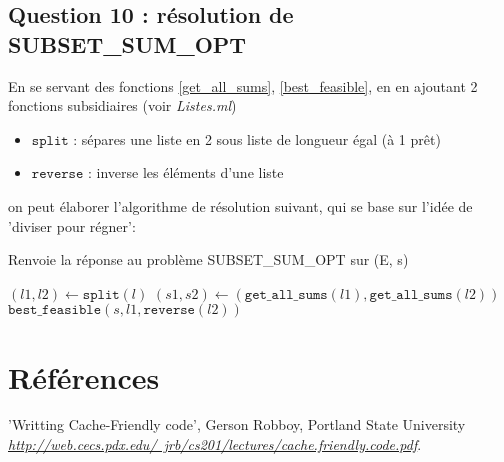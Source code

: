 \documentclass[10pt]{article}
\let\oldReturn\Return
\renewcommand{\Return}{\State\oldReturn}
\begin{document}
			\subsection{Question 10 : résolution de SUBSET\_SUM\_OPT}
				En se servant des fonctions \ref{get_all_sums}, \ref{best_feasible},
				en en ajoutant 2 fonctions subsidiaires (voir \textit{Listes.ml})
				\begin{itemize}[label=-]
					\setlength\itemsep{0.1em}
					\item $\mathtt{split}$ : sépares une liste en 2 sous liste de longueur égal (à 1 prêt)
					\item $\mathtt{reverse}$ : inverse les éléments d'une liste
				\end{itemize}
				on peut élaborer l'algorithme de résolution suivant, qui se base sur l'idée de 'diviser pour régner':
				\begin{algorithm}
					\caption{Renvoie la réponse au problème SUBSET\_SUM\_OPT sur (E, s)}
					\begin{algorithmic}[1]
							\State $(l1, l2) \leftarrow \mathtt{split}(l)$
							\State $(s1, s2) \leftarrow (\mathtt{get\_all\_sums}(l1), \mathtt{get\_all\_sums}(l2))$
							\Return $\mathtt{best\_feasible}(s, l1, \mathtt{reverse}(l2))$
						\EndFunction
					\end{algorithmic}
				\end{algorithm}
	\newpage
	\section{Références}
		\begin{thebibliography}{}
				'Writting Cache-Friendly code', Gerson Robboy, Portland State University\newline
				\href{http://web.cecs.pdx.edu/~jrb/cs201/lectures/cache.friendly.code.pdf}
				      {\textit{http://web.cecs.pdx.edu/~jrb/cs201/lectures/cache.friendly.code.pdf}}.
  \end{thebibliography}
\end{document}
